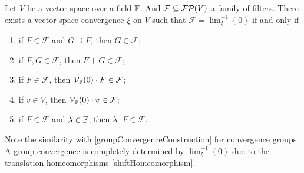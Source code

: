 \begin{proposition} \label{vectorSpaceConvergenceConstruction}
Let $V$ be a vector space over a field $\mathbb{F}$. And $\mathcal{F} \subseteq \operatorname{\mathcal{FP}}(V)$ a family of filters. There exists a vector space convergence $\xi$ on $V$ such that $\mathcal{F} = \lim^{-1}_\xi(0)$ \textup{if and only if}
\begin{enumerate}
\item if $F \in \mathcal{F}$ and $G\supseteq F$, then $G\in \mathcal{F}$;
\item if $F,G \in \mathcal{F}$, then $F + G\in \mathcal{F}$;
\item if $F\in \mathcal{F}$, then $\operatorname{\mathcal{V}}_{\mathbb{F}}(0)\cdot F \in \mathcal{F}$;
\item if $v\in V$, then $\operatorname{\mathcal{V}}_{\mathbb{F}}(0)\cdot v \in \mathcal{F}$;
\item if $F\in \mathcal{F}$ and $\lambda\in \mathbb{F}$, then $\lambda\cdot F \in \mathcal{F}$.
\end{enumerate}
\end{proposition}
Note the similarity with \ref{groupConvergenceConstruction} for convergence groups. A group convergence is completely determined by $\lim^{-1}_\xi(0)$ due to the translation homeomorphisms \ref{shiftHomeomorphism}.
